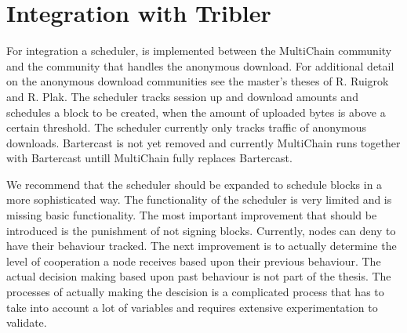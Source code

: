 \section{Integration with Tribler}
For integration a scheduler, is implemented between the MultiChain community
and the community that handles the anonymous download.
For additional detail on the anonymous download communities
see the master's theses of R. Ruigrok\cite{ruigrok-anonymous} and R. Plak\cite{Plak-anonymous}.
The scheduler tracks session up and download amounts and schedules a block to be created,
when the amount of uploaded bytes is above a certain threshold.
The scheduler currently only tracks traffic of anonymous downloads.
Bartercast is not yet removed and
currently MultiChain runs together with Bartercast untill MultiChain fully replaces Bartercast.

We recommend that the scheduler should be expanded to schedule blocks in a more sophisticated way.
The functionality of the scheduler is very limited and is missing basic functionality.
The most important improvement that should be introduced is the punishment of not signing blocks.
Currently, nodes can deny to have their behaviour tracked.
The next improvement is to actually determine the level of cooperation a node receives based upon their previous behaviour.
The actual decision making based upon past behaviour is not part of the thesis.
The processes of actually making the descision is a complicated process that has to take into account a lot of variables
and requires extensive experimentation to validate.